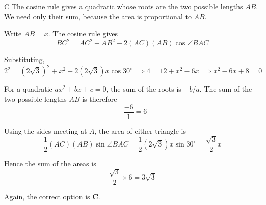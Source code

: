 \documentclass[11pt,a4paper]{article}
\begin{document}
\begin{enumerate}[label=\textbf{\arabic*.},leftmargin=*,itemsep=0pt,start=1]
\begin{djsSolution}{C}
The cosine rule gives a quadratic whose roots are the two possible lengths $AB$. We need only their sum, because the area is proportional to $AB$.

Write $AB=x$. The cosine rule gives
\[
BC^2=AC^2+AB^2-2(AC)(AB)\cos\angle BAC
\]

Substituting,
\[
2^2=(2\sqrt3)^2+x^2-2(2\sqrt3)x\cos30^\circ
\implies 4=12+x^2-6x
\implies x^2-6x+8=0
\]

For a quadratic $ax^2+bx+c=0$, the sum of the roots is $-b/a$. The sum of the two possible lengths $AB$ is therefore
\[
-\frac{-6}{1}=6
\]

Using the sides meeting at $A$, the area of either triangle is
\[
\frac12(AC)(AB)\sin\angle BAC
=\frac12(2\sqrt3)x\sin30^\circ
=\frac{\sqrt3}{2}x
\]

Hence the sum of the areas is
\[
\frac{\sqrt3}{2}\times6=3\sqrt3
\]

Again, the correct option is \textbf{C}.
\end{djsSolution}
\end{enumerate}
\clearpage
\thispagestyle{djssolutions}
\vspace*{8pt}
\end{document}
